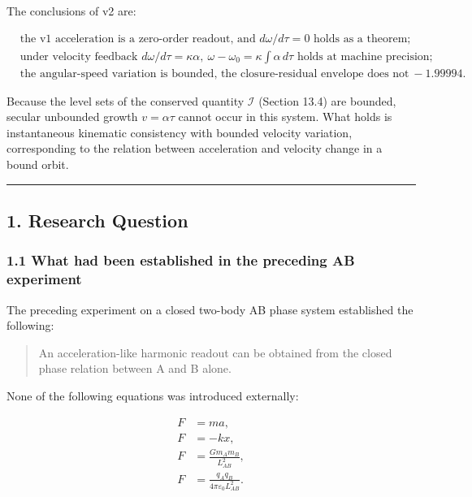 \documentclass[
  a4paper,
]{article}
\begin{document}
The conclusions of v2 are:

\[
\boxed{
\begin{aligned}
&\text{the v1 acceleration is a zero-order readout, and }d\omega/d\tau=0\text{ holds as a theorem;}\\
&\text{under velocity feedback }d\omega/d\tau=\kappa\alpha,\ \omega-\omega_0=\kappa\int\alpha\,d\tau\text{ holds at machine precision;}\\
&\text{the angular-speed variation is bounded, the closure-residual envelope does not grow, and the inverse-square law survives with exponent }-1.99994.
\end{aligned}
}
\]

Because the level sets of the conserved quantity \(\mathcal I\) (Section
13.4) are bounded, secular unbounded growth \(v=\alpha\tau\) cannot
occur in this system. What holds is instantaneous kinematic consistency
with bounded velocity variation, corresponding to the relation between
acceleration and velocity change in a bound orbit.

\begin{center}\rule{0.5\linewidth}{0.5pt}\end{center}

\subsection{1. Research Question}\label{research-question}

\subsubsection{1.1 What had been established in the preceding AB
experiment}\label{what-had-been-established-in-the-preceding-ab-experiment}

The preceding experiment on a closed two-body AB phase system
established the following:

\begin{quote}
An acceleration-like harmonic readout can be obtained from the closed
phase relation between A and B alone.
\end{quote}

None of the following equations was introduced externally:

\[
\begin{aligned}
F&=ma,\\
F&=-kx,\\
F&=\frac{Gm_A m_B}{L_{AB}^2},\\
F&=\frac{q_Aq_B}{4\pi\varepsilon_0L_{AB}^2}.
\end{aligned}
\]
\end{document}
